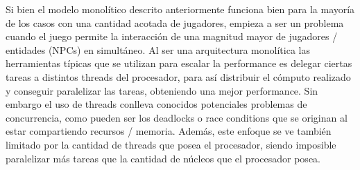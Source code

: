 
\noindent Si bien el modelo monolítico descrito anteriormente funciona bien para la mayoría de los 
casos con una cantidad acotada de jugadores, empieza a ser un problema cuando el juego 
permite la interacción de una magnitud mayor de jugadores / entidades (NPCs) en simultáneo. 
Al ser una arquitectura monolítica las herramientas típicas que se utilizan para escalar 
la performance es delegar ciertas tareas a distintos threads del procesador, para así distribuir 
el cómputo realizado y conseguir paralelizar las tareas, obteniendo una mejor performance. 
Sin embargo el uso de threads conlleva conocidos potenciales problemas de concurrencia, 
como pueden ser los deadlocks o race conditions que se originan al estar compartiendo 
recursos / memoria. Además, este enfoque se ve también limitado por la cantidad de threads 
que posea el procesador, siendo imposible paralelizar más tareas que la cantidad de núcleos 
que el procesador posea.
